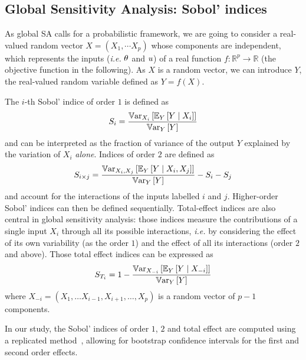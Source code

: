 \documentclass[../../Main_ManuscritThese.tex]{subfiles}
\begin{document}
\subsection{Global Sensitivity Analysis: Sobol' indices}
\label{sec:sobol-indices}
As global SA calls for a probabilistic framework, we are going to
consider a real-valued random vector $X=(X_1,\cdots X_p)$ whose
components are independent, which represents the inputs (\emph{i.e.}
$\theta$ and $u$) of a real function
$f: \mathbb{R}^p\rightarrow \mathbb{R}$ (the objective function in the
following). As $X$ is a random vector, we can introduce $Y$, the
real-valued random variable defined as $Y=f(X)$.

The $i$-th Sobol' indice of order $1$ is defined
as~\citep{sobol_sensitivity_1993,sobol_global_2001}
\begin{equation}
  S_i = \frac{\mathbb{V}\mathrm{ar}_{X_i}\left[\mathbb{E}_{Y}\left[Y \mid X_i\right]\right]}{\mathbb{V}\mathrm{ar}_{Y}\left[Y\right]}
\end{equation}
and can be interpreted as the fraction of variance of the output
$Y$ explained by the variation of $X_i$ \emph{alone}. Indices of
order $2$ are defined as
\begin{equation}
  S_{i\times j} = \frac{\mathbb{V}\mathrm{ar}_{X_i, X_j}\left[\mathbb{E}_{Y}\left[Y \mid X_i, X_j\right]\right]}{\mathbb{V}\mathrm{ar}_{Y}\left[Y\right]} - S_i -S_j
\end{equation}
and account for the interactions of the inputs labelled $i$ and $j$.
Higher-order Sobol' indices can then be defined
sequentially. Total-effect indices are also central in global
sensitivity analysis: those indices measure the contributions of a
single input $X_i$ through all its possible interactions,
\textit{i.e.} by considering the effect of its own variability (as the
order $1$) and the effect of all its interactions (order $2$ and
above). Those total effect indices can be expressed as
\begin{equation}
  S_{T_i} = 1 - \frac{\mathbb{V}\mathrm{ar}_{X_{-i}}\left[\mathbb{E}_{Y}\left[Y \mid X_{-i}\right]\right]}{\mathbb{V}\mathrm{ar}_{Y}\left[Y\right]}
\end{equation}
where $X_{-i} = (X_1,\dots X_{i-1},X_{i+1},\dots,X_p)$ is a random vector of $p-1$ components.

In our study, the Sobol' indices of order $1$, $2$ and total effect
are computed using a replicated
method~\citep{gilquin_making_2019,gilquin_echantillonnages_2016},
allowing for bootstrap confidence intervals for the first and second
order effects.
\end{document}
